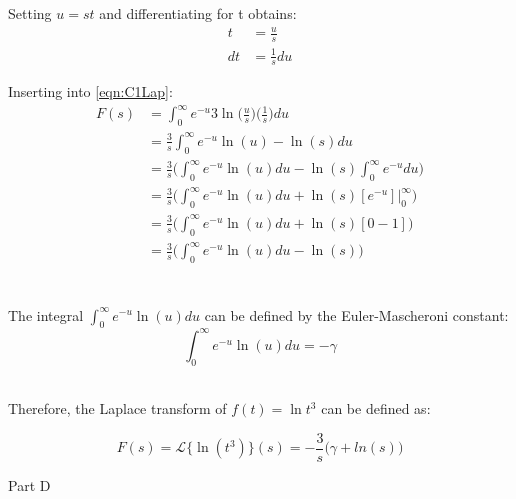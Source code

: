 \documentclass[a4paper,10pt,reqno]{amsart}
\makeatletter
\def\section{\@startsection{section}{1}%
  \z@{.7\linespacing\@plus\linespacing}{.5\linespacing}%
  {\bfseries\scshape\centering}}
\numberwithin{equation}{section}
\newcommand{\lap}{\mathscr{L}}
\makeatother
\begin{document}
\par Setting $u = st$ and differentiating for t obtains:
\begin{align*}
    t &{}={} \frac{u}{s}
    \\
    dt &{}={} \frac{1}{s} du
\end{align*}
\par Inserting into \ref{eqn:C1Lap}:
\begin{align*}
    F(s) &= \int_0^\infty e^{-u}  3\ln{\bigg(\frac{u}{s}\bigg)}\bigg(\frac{1}{s}\bigg)  du
    \\
    &= \frac{3}{s} \int_0^\infty e^{-u}  \ln(u)-\ln(s) du
    \\
    &= \frac{3}{s} \bigg(\int_0^\infty e^{-u} \ln(u) du - \ln(s)\int_0^\infty e^{-u} du\bigg)
    \\
    &= \frac{3}{s} \bigg(\int_0^\infty e^{-u} \ln(u) du + \ln(s)[e^{-u}]\big\rvert^\infty_0\bigg)
    \\
    &= \frac{3}{s} \bigg(\int_0^\infty e^{-u} \ln(u) du + \ln(s)[0-1]\bigg)
    \\
    &= \frac{3}{s} \bigg(\int_0^\infty e^{-u} \ln(u) du -\ln(s)\bigg)
    \\
\end{align*}
\\
\par The integral $\int_0^\infty e^{-u} \ln(u) du$ can be defined by the Euler-Mascheroni constant:
\begin{equation}
    \int_0^\infty e^{-u} \ln(u) du = -\gamma
\end{equation}
\\
\par Therefore, the Laplace transform of $f(t)=\ln{t^3}$ can be defined as:

\begin{equation}
   F(s) = \lap\{\ln{(t^3)}\}(s) = -\frac{3}{s}\bigg(\gamma + ln(s)\bigg)
\end{equation}

\newpage
\section{Part D}
\end{document}
